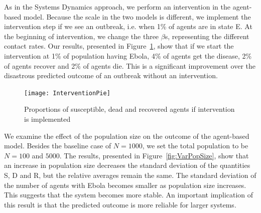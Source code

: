 
As in the Systems Dynamics approach, we perform an intervention in the agent-based model. Because the scale in the two models is different, we implement the intervention step if we see an outbreak, i.e. when 1\% of agents are in state E. At the beginning of intervention, we change the three $\beta$s, representing the different contact rates. Our results, presented in Figure~\ref{fig:InterventionPie}, show that if we start the intervention at 1\% of population having Ebola, 4\% of agents get the disease, 2\% of agents recover and 2\% of agents die. This is a significant improvement over the disastrous predicted outcome of an outbreak without an intervention. 



\begin{figure}[h!]
\begin{center}
\texttt{[image: InterventionPie]}
\end{center}
\caption{Proportions of susceptible, dead and recovered agents if intervention is implemented}
\label{fig:InterventionPie}
\end{figure}

We examine the effect of the population size on the outcome of the agent-based model. Besides the baseline case of $N = 1000$, we set the total population to be $N = 100$ and $5000$. The results, presented in Figure~\ref{fig:VarPopSize}, show that an increase in population size decreases the standard deviation of the quantities S, D and R, but the relative averages remain the same. The standard deviation of the number of agents with Ebola becomes smaller as population size increases. This suggests that the system becomes more stable. An important implication of this result is that the predicted outcome is more reliable for larger systems.


